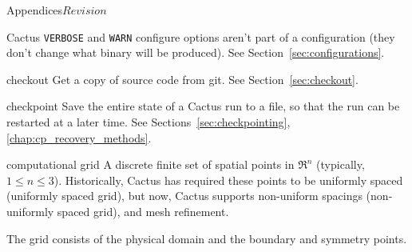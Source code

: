 \begin{cactuspart}{Appendices}{}{$Revision$}
\begin{Lentry}
  Cactus \verb|VERBOSE| and \verb|WARN| configure options aren't part
  of a configuration (they don't change what binary will be produced).
  See Section~\ref{sec:configurations}.
\item[checkout]
  Get a copy of source code from git.  See Section~\ref{sec:checkout}.
\item[checkpoint]
  Save the entire state of a Cactus run to a file, so that the run can be
  restarted at a later time.
  See Sections~\ref{sec:checkpointing}, \ref{chap:cp_recovery_methods}.
\item[computational grid]
  A discrete finite set of spatial points in $\Re^n$
  (typically, $1 \le n \le 3$).
  Historically, Cactus has required these points to be uniformly spaced
  (uniformly spaced grid), but now, Cactus
  supports non-uniform spacings (non-uniformly spaced grid), and mesh refinement.

  The grid consists of the physical domain and the boundary and symmetry
  points.


\end{Lentry}
\end{cactuspart}
